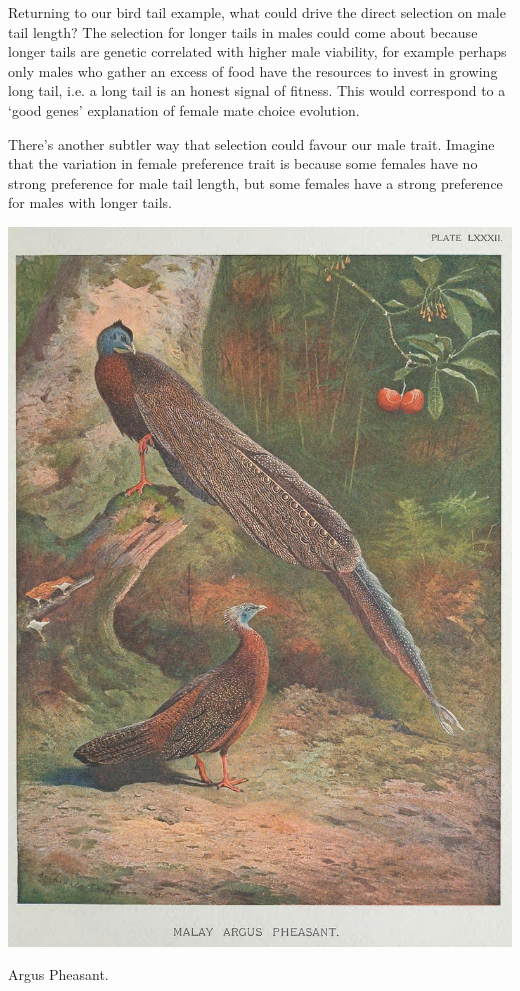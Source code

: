 Returning to our bird tail example, what could drive the direct
selection on male tail length? The selection for longer tails in males could come about because
longer tails are genetic correlated with higher male viability, for
example perhaps only males who gather an excess of food have the
resources to invest in growing long tail, i.e. a long tail is an
honest signal of fitness. This would correspond to a `good genes' explanation of female mate
choice evolution.  



There's another subtler way that selection could favour our male
trait. Imagine that the variation in female preference trait is
because some females have no strong preference for male tail
length, but some females have a strong preference for males with
longer tails.
\begin{marginfigure}
\begin{center}
\includegraphics[width= \textwidth]{illustration_images/Quant_gen/Argus_pheasant/Argus_pheasant_small.jpg}
\end{center}
\caption{Argus Pheasant.  } \label{fig:argus}
\end{marginfigure}
